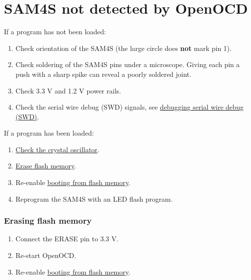 \section{SAM4S not detected by OpenOCD}
\label{sam4s-not-detected-by-openocd}

If a program has not been loaded:

\begin{enumerate}
\item
  Check orientation of the SAM4S (the large circle does \textbf{not}
  mark pin 1).
\item
  Check soldering of the SAM4S pins under a microscope. Giving
  each pin a push with a sharp spike can reveal a poorly soldered joint.
\item
  Check 3.3 V and 1.2 V power rails.
\item
  Check the serial wire debug (SWD) signals, see
  \protect\hyperref[debugging]{debugging serial wire debug (SWD)}.
\end{enumerate}

If a program has been loaded:

\begin{enumerate}
\item  \protect\hyperref[checking-the-crystal-oscillator]{Check the
    crystal oscillator}.
  
\item \hyperref[erasing-flash-memory]{Erase flash memory}.
  
\item Re-enable \hyperref[booting-from-flash-memory]{booting from flash
  memory}.

\item  Reprogram the SAM4S with an LED flash program.
\end{enumerate}


\subsubsection{Erasing flash memory}
\label{erasing-flash-memory}

\begin{enumerate}
\item Connect the ERASE pin to 3.3 V.

\item Re-start OpenOCD.  

\item Re-enable \hyperref[booting-from-flash-memory]{booting from
  flash memory}.
\end{enumerate}


